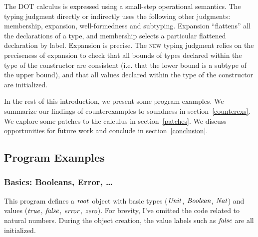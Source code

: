 \documentclass[preprint]{sigplanconf}
\begin{document}
The DOT calculus is expressed using a small-step operational
semantics. The typing judgment directly or indirectly uses the
following other judgments: membership, expansion, well-formedness and
subtyping. Expansion ``flattens'' all the declarations of a type, and
membership selects a particular flattened declaration by
label. Expansion is precise. The \textsc{new} typing judgment relies
on the preciseness of expansion to check that all bounds of types
declared within the type of the constructor are consistent (i.e. that
the lower bound is a subtype of the upper bound), and that all values
declared within the type of the constructor are initialized.

In the rest of this introduction, we present some program examples. We
summarize our findings of counterexamples to soundness in
section~\ref{counterexs}. We explore some patches to the calculus in
section~\ref{patches}. We discuss opportunities for future work and
conclude in section~\ref{conclusion}.

\subsection{Program Examples}

\subsubsection{Basics: Booleans, Error, \ldots}
This program defines a $\mathit{root}$ object with basic types
($\mathit{Unit}$, $\mathit{Boolean}$, $\mathit{Nat}$) and values ($\mathit{true}$,
$\mathit{false}$, $\mathit{error}$, $\mathit{zero}$). For brevity, I've omitted
the code related to natural numbers. During the object creation, the
value labels such as $\mathit{false}$ are all initialized.
\end{document}
